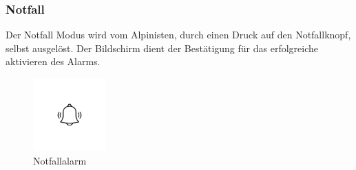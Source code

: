 \documentclass[11pt,english,german]{report}
\theoremstyle{definition}
\begin{document}
\subsubsection{Notfall}
Der Notfall Modus wird vom Alpinisten, durch einen Druck auf den Notfallknopf, selbst ausgelöst. Der Bildschirm dient der Bestätigung für das erfolgreiche aktivieren des Alarms.
\begin{figure}[H]
	\centering
	\includegraphics[width=0.25\textwidth]{img/prototype/alarmbell.jpg}
	\caption[Notfallalarm]
	{Notfallalarm}
\end{figure}%

\newpage
\end{document}
